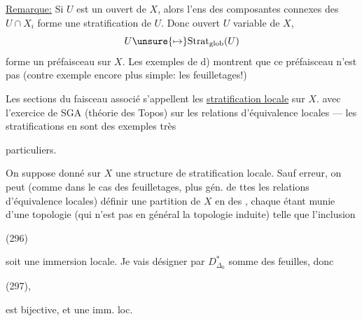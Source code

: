 
\uline{Remarque:} Si $U$ est un ouvert de $X$, alors l'ens des composantes connexes des $U\cap X_i$ forme  une stratification  de $U$. Donc   ouvert $U$ variable de $X$,
\[
U\unsure{\mapsto}\mathrm{Strat}_{\mathrm{glob}}(U)
\]
forme un préfaisceau sur $X$. Les exemples de d) montrent que ce préfaisceau n'est pas   (contre exemple encore plus simple: les feuilletages!)


Les sections du faisceau associé s'appellent les  \uline{stratification locale} sur $X$.  avec l'exercice de SGA (théorie des Topos) sur les relations d'équivalence locales --- les stratifications en sont des exemples très



particuliers.


On suppose donné sur $X$ une structure de stratification locale. Sauf erreur, on peut (comme dans le cas des feuilletages, plus gén. de ttes les relations d'équivalence locales) définir  une partition de $X$ en des  , chaque   étant munie d'une topologie (qui n'est pas en général la topologie induite) telle que l'inclusion

(296)\quad{}

soit une immersion locale. Je vais désigner par $D_{\Delta_0}^{*}$   somme des feuilles, donc

(297)\quad{},

 est bijective, et une imm. loc.


